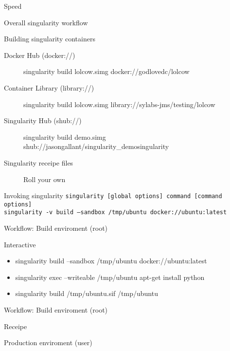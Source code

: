 \documentclass{beamer}
\begin{document}
  \begin{frame}{Speed}

  \end{frame}

  \begin{frame}{Overall singularity workflow}
    
  \end{frame}

  \begin{frame}{Building singularity containers}
    \begin{description}
      \item[Docker Hub (docker://)] singularity build lolcow.simg docker://godlovedc/lolcow
      \item[Container Library (library://)] singularity build lolcow.simg library://sylabs-jms/testing/lolcow
      \item[Singularity Hub (shub://)] singularity build demo.simg shub://jasongallant/singularity\_demosingularity
      \item[Singularity receipe files] Roll your own
    \end{description}
  \end{frame}

  \begin{frame}{Invoking singularity}
    \footnotesize
    \texttt{singularity [global options] command [command options]}\\
    \texttt{singularity -v build --sandbox /tmp/ubuntu docker://ubuntu:latest}
  \end{frame}

  \begin{frame}{Workflow: Build enviroment (root)}
        \begin{block}{Interactive}
          \begin{itemize}
            \item singularity build --sandbox /tmp/ubuntu docker://ubuntu:latest
            \item singularity exec --writeable /tmp/ubuntu apt-get install python
            \item singularity build /tmp/ubuntu.sif /tmp/ubuntu
          \end{itemize}
        \end{block}
  \end{frame}
  \begin{frame}{Workflow: Build enviroment (root)}
    \begin{block}{Receipe}

    \end{block}
  \end{frame}
  \begin{frame}
    \begin{block}{Production enviroment (user)}

    \end{block}
  \end{frame}
\end{document}

